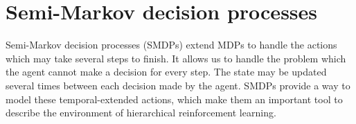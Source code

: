 


\section{Semi-Markov decision processes}
\label{se:SMDP}

Semi-Markov decision processes (SMDPs) \cite{Puterman94} extend MDPs to handle the actions 
which may take several steps to finish. It allows us to handle
the problem which the agent 
cannot make a decision for every step. 
The state may be updated several times between
each decision made by the agent.  
SMDPs provide a way to model these temporal-extended actions, which
make them an important tool to describe the environment of hierarchical 
reinforcement learning.

